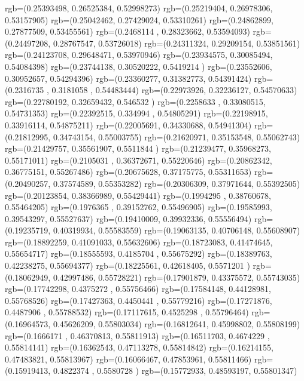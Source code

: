 {{{		  rgb=(0.25393498,  0.26525384,  0.52998273)
		  rgb=(0.25219404,  0.26978306,  0.53157905)
		  rgb=(0.25042462,  0.27429024,  0.53310261)
		  rgb=(0.24862899,  0.27877509,  0.53455561)
		  rgb=(0.2468114 ,  0.28323662,  0.53594093)
		  rgb=(0.24497208,  0.28767547,  0.53726018)
		  rgb=(0.24311324,  0.29209154,  0.53851561)
		  rgb=(0.24123708,  0.29648471,  0.53970946)
		  rgb=(0.23934575,  0.30085494,  0.54084398)
		  rgb=(0.23744138,  0.30520222,  0.5419214 )
		  rgb=(0.23552606,  0.30952657,  0.54294396)
		  rgb=(0.23360277,  0.31382773,  0.54391424)
		  rgb=(0.2316735 ,  0.3181058 ,  0.54483444)
		  rgb=(0.22973926,  0.32236127,  0.54570633)
		  rgb=(0.22780192,  0.32659432,  0.546532  )
		  rgb=(0.2258633 ,  0.33080515,  0.54731353)
		  rgb=(0.22392515,  0.334994  ,  0.54805291)
		  rgb=(0.22198915,  0.33916114,  0.54875211)
		  rgb=(0.22005691,  0.34330688,  0.54941304)
		  rgb=(0.21812995,  0.34743154,  0.55003755)
		  rgb=(0.21620971,  0.35153548,  0.55062743)
		  rgb=(0.21429757,  0.35561907,  0.5511844 )
		  rgb=(0.21239477,  0.35968273,  0.55171011)
		  rgb=(0.2105031 ,  0.36372671,  0.55220646)
		  rgb=(0.20862342,  0.36775151,  0.55267486)
		  rgb=(0.20675628,  0.37175775,  0.55311653)
		  rgb=(0.20490257,  0.37574589,  0.55353282)
		  rgb=(0.20306309,  0.37971644,  0.55392505)
		  rgb=(0.20123854,  0.38366989,  0.55429441)
		  rgb=(0.1994295 ,  0.38760678,  0.55464205)
		  rgb=(0.1976365 ,  0.39152762,  0.55496905)
		  rgb=(0.19585993,  0.39543297,  0.55527637)
		  rgb=(0.19410009,  0.39932336,  0.55556494)
		  rgb=(0.19235719,  0.40319934,  0.55583559)
		  rgb=(0.19063135,  0.40706148,  0.55608907)
		  rgb=(0.18892259,  0.41091033,  0.55632606)
		  rgb=(0.18723083,  0.41474645,  0.55654717)
		  rgb=(0.18555593,  0.4185704 ,  0.55675292)
		  rgb=(0.18389763,  0.42238275,  0.55694377)
		  rgb=(0.18225561,  0.42618405,  0.5571201 )
		  rgb=(0.18062949,  0.42997486,  0.55728221)
		  rgb=(0.17901879,  0.43375572,  0.55743035)
		  rgb=(0.17742298,  0.4375272 ,  0.55756466)
		  rgb=(0.17584148,  0.44128981,  0.55768526)
		  rgb=(0.17427363,  0.4450441 ,  0.55779216)
		  rgb=(0.17271876,  0.4487906 ,  0.55788532)
		  rgb=(0.17117615,  0.4525298 ,  0.55796464)
		  rgb=(0.16964573,  0.45626209,  0.55803034)
		  rgb=(0.16812641,  0.45998802,  0.55808199)
		  rgb=(0.1666171 ,  0.46370813,  0.55811913)
		  rgb=(0.16511703,  0.4674229 ,  0.55814141)
		  rgb=(0.16362543,  0.47113278,  0.55814842)
		  rgb=(0.16214155,  0.47483821,  0.55813967)
		  rgb=(0.16066467,  0.47853961,  0.55811466)
		  rgb=(0.15919413,  0.4822374 ,  0.5580728 )
		  rgb=(0.15772933,  0.48593197,  0.55801347)
}}}
